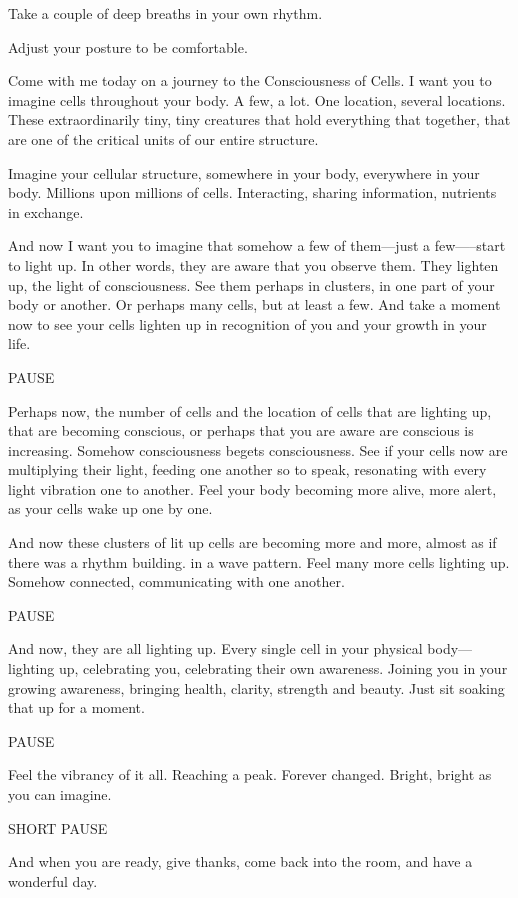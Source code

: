 \documentclass[12pt]{book}
\begin{document}
{\em

  Take a couple of deep breaths in your own rhythm.
  
  Adjust your posture to be comfortable.
  
Come with me today on a journey to the Consciousness of Cells. I want		
you to imagine cells throughout your body. A few, a lot. One location, several locations. These extraordinarily tiny, tiny creatures that hold everything that together, that are one of the critical units of our entire structure.
					
Imagine your cellular structure, somewhere in your body, everywhere in your body. Millions upon millions of cells. Interacting, sharing information, nutrients in exchange.
					
And now I want you to imagine that somehow a few of them---just a few—--start to light up. In other words, they are aware that you observe them. They lighten up, the light of consciousness. See them perhaps in clusters, in one part of your body or another. Or perhaps many cells, but at least a few. And take a moment now to see your cells lighten up in recognition of you and your growth in your life.
					
PAUSE
					
Perhaps now, the number of cells and the location of cells that are lighting up, that are becoming conscious, or perhaps that you are aware are conscious is increasing. Somehow consciousness begets consciousness. See if your cells now are multiplying their light, feeding one another so to speak, resonating with every light vibration one to another. Feel your body becoming more alive, more alert, as your cells wake up one by one.


And now these clusters of lit up cells are becoming more and more, almost as if there was a rhythm building. in a wave pattern. Feel many more cells lighting up. Somehow connected, communicating with one another.
					
PAUSE
					
And now, they are all lighting up. Every single cell in your physical body— lighting up, celebrating you, celebrating their own awareness. Joining you in your growing awareness, bringing health, clarity, strength and beauty. Just sit soaking that up for a moment.
					
PAUSE
					
Feel the vibrancy of it all. Reaching a peak. Forever changed. Bright, bright as you can imagine.
					
SHORT PAUSE
					
And when you are ready, give thanks, come back into the room, and have a wonderful day.

}
\end{document}
